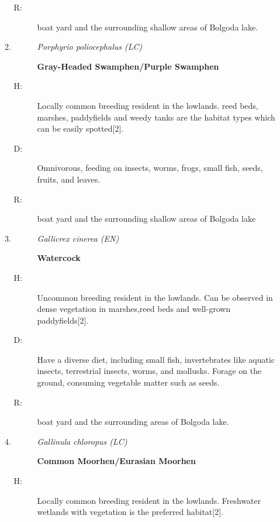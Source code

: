 \begin{itemize}
\begin{enumerate}
\begin{description}
\item[R: ]%
boat yard and the surrounding shallow areas of Bolgoda lake.%
\end{description}%
\item%
\begin{description}%
\item[]%
\textit{Porphyrio poliocephalus (LC)}%
\item[]%
\textbf{Gray{-}Headed Swamphen/Purple Swamphen}%
\end{description}%
\begin{description}%
\item[H: ]%
Locally common breeding resident in the lowlands. reed beds, marshes, paddyfields and weedy tanks are the habitat types which can be easily spotted{[}2{]}.%
\item[D: ]%
Omnivorous, feeding on insects, worms, frogs, small fish, seeds, fruits, and leaves.%
\item[R: ]%
boat yard and the surrounding shallow areas of Bolgoda lake%
\end{description}%
\item%
\begin{description}%
\item[]%
\textit{Gallicrex cinerea (EN)}%
\item[]%
\textbf{Watercock}%
\end{description}%
\begin{description}%
\item[H: ]%
Uncommon breeding resident in the lowlands. Can be observed in dense vegetation in marshes,reed beds and well{-}grown paddyfields{[}2{]}.%
\item[D: ]%
Have a diverse diet, including small fish, invertebrates like aquatic insects, terrestrial insects, worms, and mollusks. Forage on the ground, consuming vegetable matter such as seeds.%
\item[R: ]%
boat yard and the surrounding areas of Bolgoda lake.%
\end{description}%
\item%
\begin{description}%
\item[]%
\textit{Gallinula chloropus (LC)}%
\item[]%
\textbf{Common Moorhen/Eurasian Moorhen}%
\end{description}%
\begin{description}%
\item[H: ]%
Locally common breeding resident in the lowlands. Freshwater wetlands with vegetation is the preferred habitat{[}2{]}.%

\end{description}
\end{enumerate}
\end{itemize}

